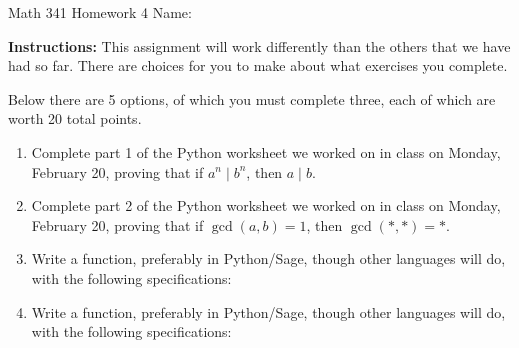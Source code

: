 \documentclass[12pt]{article}
\begin{document}
	Math 341 Homework 4
	\hfill
	Name: \underline{\hspace*{2in}}
	
	\textbf{Instructions:} This assignment will work differently than the others that we have had so far. There are choices for you to make about what exercises you complete.
	
	Below there are 5 options, of which you must complete three, each of which are worth 20 total points.
\begin{enumerate}
	\item Complete part 1 of the Python worksheet we worked on in class on Monday, February 20, proving that if $a^n\mid b^n$, then $a\mid b$.
	\item Complete part 2 of the Python worksheet we worked on in class on Monday, February 20, proving that if $\gcd(a,b)=1$, then $\gcd(*,*)=*$.
	\item Write a function, preferably in Python/Sage, though other languages will do, with the following specifications:
	
	
	\item Write a function, preferably in Python/Sage, though other languages will do, with the following specifications:
	
\end{enumerate}
\end{document}

